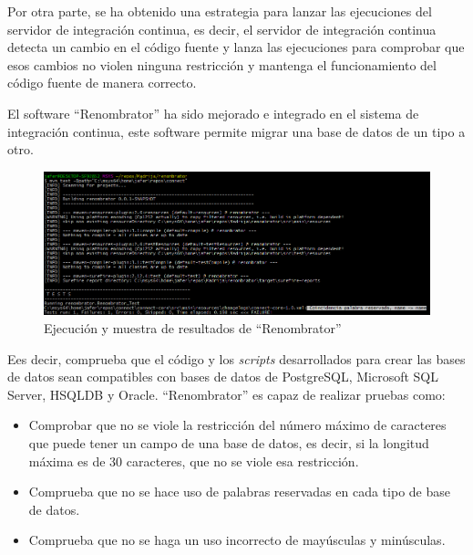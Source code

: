 Por otra parte, se ha obtenido una estrategia para lanzar las ejecuciones del servidor de integración continua, es decir, el servidor de integración continua detecta un cambio en el código fuente y lanza las ejecuciones para comprobar que esos cambios no violen ninguna restricción y mantenga el funcionamiento del código fuente de manera correcto.

El software ``Renombrator'' ha sido mejorado e integrado en el sistema de integración continua, este software permite migrar una base de datos de un tipo a otro.

\begin{figure}[!h]
\centering
   \includegraphics[width=15cm]{RenombratorResultado.PNG}
\caption{Ejecución y muestra de resultados de ``Renombrator''}
\end{figure}

Ees decir, comprueba que el código y los \textit{scripts} desarrollados para crear las bases de datos sean compatibles con bases de datos de PostgreSQL, Microsoft SQL Server, HSQLDB y Oracle. ``Renombrator'' es capaz de realizar pruebas como:

\begin{itemize}
	\item Comprobar que no se viole la restricción del número máximo de caracteres que puede tener un campo de una base de datos, es decir, si la longitud máxima es de 30 caracteres, que no se viole esa restricción.
	\item Comprueba que no se hace uso de palabras reservadas en cada tipo de base de datos.
	\item Comprueba que no se haga un uso incorrecto de mayúsculas y minúsculas.
\end{itemize}

